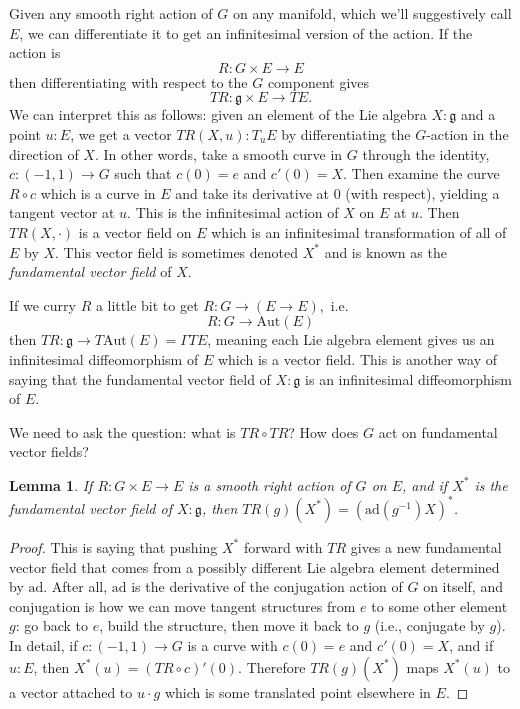 \documentclass[12pt]{article}
\newcommand{\Aut}{\mathrm{Aut}}
\newcommand{\ad}{\mathrm{ad}}
\newtheorem{mylemma}{Lemma}
\begin{document}
Given any smooth right action of $G$ on any manifold, which we'll suggestively call $E$, we can differentiate it to get an infinitesimal version of the action. If the action is $$R:G\times E \to E$$ then differentiating with respect to the $G$ component gives $$TR:\mathfrak{g}\times E \to TE.$$ We can interpret this as follows: given an element of the Lie algebra $X:\mathfrak{g}$ and a point $u:E$, we get a vector $TR(X, u):T_u E$ by differentiating the $G$-action in the direction of $X$. In other words, take a smooth curve in $G$ through the identity, $c:(-1, 1)\to G$ such that $c(0)=e$ and $c'(0)=X$. Then examine the curve $R\circ c$ which is a curve in $E$ and take its derivative at 0 (with respect), yielding a tangent vector at $u$. This is the infinitesimal action of $X$ on $E$ at $u$. Then $TR(X, \cdot)$ is a vector field on $E$ which is an infinitesimal transformation of all of $E$ by $X$. This vector field is sometimes denoted $X^*$ and is known as the \emph{fundamental vector field} of $X$.

If we curry $R$ a little bit to get $R:G\to (E \to E),$ i.e. $$R:G\to \Aut(E)$$ then $TR:\mathfrak{g}\to T\Aut(E)=\Gamma TE$, meaning each Lie algebra element gives us an infinitesimal diffeomorphism of $E$ which is a vector field. This is another way of saying that the fundamental vector field of $X:\mathfrak{g}$ is an infinitesimal diffeomorphism of $E$.

We need to ask the question: what is $TR\circ TR$? How does $G$ act on fundamental vector fields? 
\begin{mylemma}
If $R:G\times E \to E$ is a smooth right action of $G$ on $E$, and if $X^*$ is the fundamental vector field of $X:\mathfrak{g}$, then $TR(g)(X^*)=(\ad(g^{-1})X)^*$.
\end{mylemma}
\begin{proof}
This is saying that pushing $X^*$ forward with $TR$ gives a new fundamental vector field that comes from a possibly different Lie algebra element determined by $\ad$. After all, $\ad$ is the derivative of the conjugation action of $G$ on itself, and conjugation is how we can move tangent structures from $e$ to some other element $g$: go back to $e$, build the structure, then move it back to $g$ (i.e., conjugate by $g$). In detail, if $c:(-1,1)\to G$ is a curve with $c(0)=e$ and $c'(0)=X$, and if $u:E$, then $X^*(u)=(TR\circ c)'(0)$. Therefore $TR(g)(X^*)$ maps $X^*(u)$ to a vector attached to $u\cdot g$ which is some translated point elsewhere in $E$. 
\end{proof}
\end{document}
